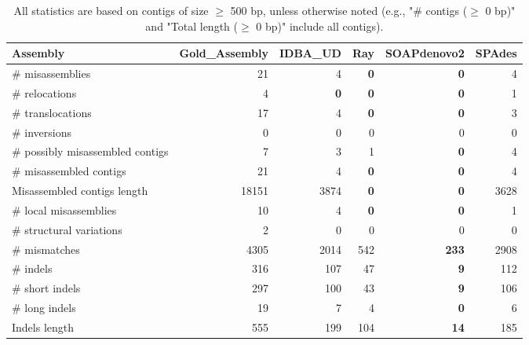 \documentclass[12pt,a4paper]{article}
\begin{document}
\begin{table}[ht]
\begin{center}
\caption{All statistics are based on contigs of size $\geq$ 500 bp, unless otherwise noted (e.g., "\# contigs ($\geq$ 0 bp)" and "Total length ($\geq$ 0 bp)" include all contigs).}
\begin{tabular}{|l*{5}{|r}|}
\hline
Assembly & Gold\_Assembly & IDBA\_UD & Ray & SOAPdenovo2 & SPAdes \\ \hline
\# misassemblies & 21 & 4 & {\bf 0} & {\bf 0} & 4 \\ \hline
\hspace{5mm}\# relocations & 4 & {\bf 0} & {\bf 0} & {\bf 0} & 1 \\ \hline
\hspace{5mm}\# translocations & 17 & 4 & {\bf 0} & {\bf 0} & 3 \\ \hline
\hspace{5mm}\# inversions & 0 & 0 & 0 & 0 & 0 \\ \hline
\# possibly misassembled contigs & 7 & 3 & 1 & {\bf 0} & 4 \\ \hline
\# misassembled contigs & 21 & 4 & {\bf 0} & {\bf 0} & 4 \\ \hline
Misassembled contigs length & 18151 & 3874 & {\bf 0} & {\bf 0} & 3628 \\ \hline
\# local misassemblies & 10 & 4 & {\bf 0} & {\bf 0} & 1 \\ \hline
\# structural variations & 2 & 0 & 0 & 0 & 0 \\ \hline
\# mismatches & 4305 & 2014 & 542 & {\bf 233} & 2908 \\ \hline
\# indels & 316 & 107 & 47 & {\bf 9} & 112 \\ \hline
\hspace{5mm}\# short indels & 297 & 100 & 43 & {\bf 9} & 106 \\ \hline
\hspace{5mm}\# long indels & 19 & 7 & 4 & {\bf 0} & 6 \\ \hline
Indels length & 555 & 199 & 104 & {\bf 14} & 185 \\ \hline
\end{tabular}
\end{center}
\end{table}
\end{document}
